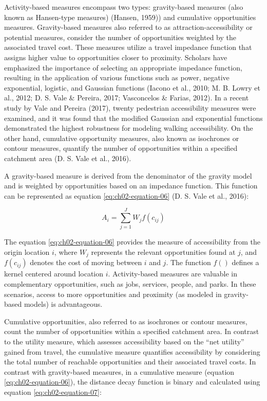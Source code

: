 \documentclass[
11pt, %
oneside, %
english, %
singlespacing, %
]{macthesis} %
\begin{document}
Activity-based measures encompass two types: gravity-based measures (also known as Hansen-type measures) (Hansen, 1959)) and cumulative opportunities measures. Gravity-based measures also referred to as attraction-accessibility or potential measures, consider the number of opportunities weighted by the associated travel cost. These measures utilize a travel impedance function that assigns higher value to opportunities closer to proximity. Scholars have emphasized the importance of selecting an appropriate impedance function, resulting in the application of various functions such as power, negative exponential, logistic, and Gaussian functions (Iacono et al., 2010; M. B. Lowry et al., 2012; D. S. Vale \& Pereira, 2017; Vasconcelos \& Farias, 2012). In a recent study by Vale and Pereira (2017), twenty pedestrian accessibility measures were examined, and it was found that the modified Gaussian and exponential functions demonstrated the highest robustness for modeling walking accessibility. On the other hand, cumulative opportunity measures, also known as isochrones or contour measures, quantify the number of opportunities within a specified catchment area (D. S. Vale et al., 2016).

A gravity-based measure is derived from the denominator of the gravity model and is weighted by opportunities based on an impedance function. This function can be represented as equation \ref{eq:ch02-equation-06} (D. S. Vale et al., 2016):

\begin{equation}
A_i = \sum_{j = 1}^{J} W_{j} f(c_{ij})
\label{eq:ch02-equation-06}
\end{equation}

The equation \ref{eq:ch02-equation-06} provides the measure of accessibility from the origin location \(i\), where \(W_j\) represents the relevant opportunities found at \(j\), and \(f(c_{ij})\) denotes the cost of moving between \(i\) and \(j\). The function \(f()\) defines a kernel centered around location \(i\). Activity-based measures are valuable in complementary opportunities, such as jobs, services, people, and parks. In these scenarios, access to more opportunities and proximity (as modeled in gravity-based models) is advantageous.

Cumulative opportunities, also referred to as isochrones or contour measures, count the number of opportunities within a specified catchment area. In contrast to the utility measure, which assesses accessibility based on the ``net utility'' gained from travel, the cumulative measure quantifies accessibility by considering the total number of reachable opportunities and their associated travel costs. In contrast with gravity-based measures, in a cumulative measure (equation \ref{eq:ch02-equation-06}), the distance decay function is binary and calculated using equation \ref{eq:ch02-equation-07}:
\end{document}
